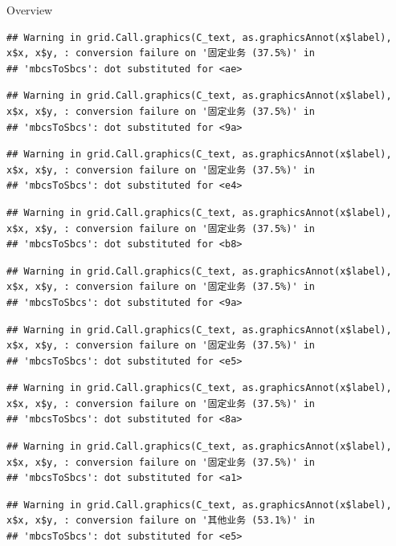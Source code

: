 \documentclass[
  5pt,
  ignorenonframetext,
]{beamer}
\begin{document}
\begin{frame}[fragile]{Overview}
\begin{verbatim}
## Warning in grid.Call.graphics(C_text, as.graphicsAnnot(x$label), x$x, x$y, : conversion failure on '固定业务 (37.5%)' in
## 'mbcsToSbcs': dot substituted for <ae>
\end{verbatim}

\begin{verbatim}
## Warning in grid.Call.graphics(C_text, as.graphicsAnnot(x$label), x$x, x$y, : conversion failure on '固定业务 (37.5%)' in
## 'mbcsToSbcs': dot substituted for <9a>
\end{verbatim}

\begin{verbatim}
## Warning in grid.Call.graphics(C_text, as.graphicsAnnot(x$label), x$x, x$y, : conversion failure on '固定业务 (37.5%)' in
## 'mbcsToSbcs': dot substituted for <e4>
\end{verbatim}

\begin{verbatim}
## Warning in grid.Call.graphics(C_text, as.graphicsAnnot(x$label), x$x, x$y, : conversion failure on '固定业务 (37.5%)' in
## 'mbcsToSbcs': dot substituted for <b8>
\end{verbatim}

\begin{verbatim}
## Warning in grid.Call.graphics(C_text, as.graphicsAnnot(x$label), x$x, x$y, : conversion failure on '固定业务 (37.5%)' in
## 'mbcsToSbcs': dot substituted for <9a>
\end{verbatim}

\begin{verbatim}
## Warning in grid.Call.graphics(C_text, as.graphicsAnnot(x$label), x$x, x$y, : conversion failure on '固定业务 (37.5%)' in
## 'mbcsToSbcs': dot substituted for <e5>
\end{verbatim}

\begin{verbatim}
## Warning in grid.Call.graphics(C_text, as.graphicsAnnot(x$label), x$x, x$y, : conversion failure on '固定业务 (37.5%)' in
## 'mbcsToSbcs': dot substituted for <8a>
\end{verbatim}

\begin{verbatim}
## Warning in grid.Call.graphics(C_text, as.graphicsAnnot(x$label), x$x, x$y, : conversion failure on '固定业务 (37.5%)' in
## 'mbcsToSbcs': dot substituted for <a1>
\end{verbatim}

\begin{verbatim}
## Warning in grid.Call.graphics(C_text, as.graphicsAnnot(x$label), x$x, x$y, : conversion failure on '其他业务 (53.1%)' in
## 'mbcsToSbcs': dot substituted for <e5>
\end{verbatim}


\end{frame}
\end{document}
